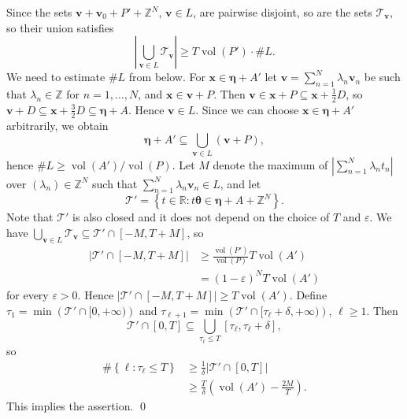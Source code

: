 \documentclass[oneside,english]{amsart}
\numberwithin{equation}{section}
\numberwithin{figure}{section}
\theoremstyle{plain}
\theoremstyle{plain}
\theoremstyle{plain}
\theoremstyle{definition}
\begin{document}
Since the sets $\boldsymbol{v}+\boldsymbol{v}_{0}+P'+\mathbb{Z}^{N}$,
$\boldsymbol{v}\in L$, are pairwise disjoint, so are the sets $\mathcal{T}_{\boldsymbol{v}}$,
so their union satisfies
\[
\left|\bigcup_{\boldsymbol{v}\in L}\mathcal{T}_{\boldsymbol{v}}\right|\geq T\operatorname{vol}\left(P'\right)\cdot\#L.
\]
We need to estimate $\#L$ from below. For $\boldsymbol{x}\in\boldsymbol{\eta}+A'$
let $\boldsymbol{v}=\sum_{n=1}^{N}\lambda_{n}\boldsymbol{v}_{n}$
be such that $\lambda_{n}\in\mathbb{Z}$ for $n=1,\dotsc,N$, and
$\boldsymbol{x}\in\boldsymbol{v}+P$. Then $\boldsymbol{v}\in\boldsymbol{x}+P\subseteq\boldsymbol{x}+\tfrac{1}{2}D$,
so $\boldsymbol{v}+D\subseteq\boldsymbol{x}+\tfrac{3}{2}D\subseteq\boldsymbol{\eta}+A$.
Hence $\boldsymbol{v}\in L$. Since we can choose $\boldsymbol{x}\in\boldsymbol{\eta}+A'$
arbitrarily, we obtain
\[
\boldsymbol{\eta}+A'\subseteq\bigcup_{\boldsymbol{v}\in L}\left(\boldsymbol{v}+P\right),
\]
hence $\#L\geq\operatorname{vol}\left(A'\right)/\operatorname{vol}\left(P\right)$.
Let $M$ denote the maximum of $\left|\sum_{n=1}^{N}\lambda_{n}t_{n}\right|$
over $\left(\lambda_{n}\right)\in\mathbb{Z}^{N}$ such that $\sum_{n=1}^{N}\lambda_{n}\boldsymbol{v}_{n}\in L$,
and let
\[
\mathcal{T}'=\left\{ t\in\mathbb{R}:t\boldsymbol{\theta}\in\boldsymbol{\eta}+A+\mathbb{Z}^{N}\right\} .
\]
Note that $\mathcal{T}'$ is also closed and it does not depend on
the choice of $T$ and $\varepsilon$. We have $\bigcup_{\boldsymbol{v}\in L}\mathcal{T}_{\boldsymbol{v}}\subseteq\mathcal{T}'\cap[-M,T+M]$,
so
\begin{align*}
\left|\mathcal{T}'\cap[-M,T+M]\right| & \geq\frac{\operatorname{vol}\left(P'\right)}{\operatorname{vol}\left(P\right)}T\operatorname{vol}\left(A'\right)\\
 & =\left(1-\varepsilon\right)^{N}T\operatorname{vol}\left(A'\right)
\end{align*}
for every $\varepsilon>0$. Hence $\left|\mathcal{T}'\cap[-M,T+M]\right|\geq T\operatorname{vol}\left(A'\right)$.
Define $\tau_{1}=\min\left(\mathcal{T}'\cap[0,+\infty)\right)$ and
$\tau_{\ell+1}=\min\left(\mathcal{T}'\cap[\tau_{\ell}+\delta,+\infty)\right)$,
$\ell\geq1$. Then
\[
\mathcal{T}'\cap[0,T]\subseteq\bigcup_{\tau_{\ell}\leq T}[\tau_{\ell},\tau_{\ell}+\delta],
\]
so
\begin{align*}
\#\left\{ \ell:\tau_{\ell}\leq T\right\}  & \geq\frac{1}{\delta}\left|\mathcal{T}'\cap[0,T]\right|\\
 & \geq\frac{T}{\delta}\left(\operatorname{vol}\left(A'\right)-\frac{2M}{T}\right).
\end{align*}
This implies the assertion. \qed 
\end{document}
